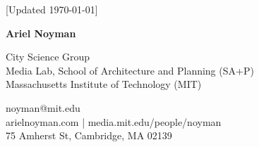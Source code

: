 \documentclass[10pt]{book}
\newcommand{\myname}{Ariel Noyman}
\begin{document}
\pagestyle{empty}
\begin{center}
    \vfill
    {[Updated \monthyeardate\today ]}
\end{center}
\vspace{2em}


\begin{flushleft}
    {\Huge\bfseries {\myname}}
\end{flushleft}

\begin{minipage}[t]{0.52\textwidth}
    \vspace{0pt}
    City Science Group\\
    Media Lab, School of Architecture and Planning (SA+P)\\
    Massachusetts Institute of Technology (MIT)
\end{minipage}%
\begin{minipage}[t]{0.48\textwidth}
    \vspace{0pt}
    \raggedleft
    noyman@mit.edu\\
    arielnoyman.com | media.mit.edu/people/noyman\\
    75 Amherst St, Cambridge, MA 02139
\end{minipage}














\end{document}

